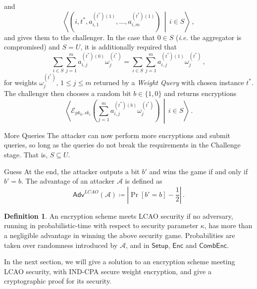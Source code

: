 \documentclass[10pt,letterpaper,oneside,twocolumn,journal]{IEEEtran}
\theoremstyle{definition}
\newtheorem{definition}{Definition}[section]
\theoremstyle{definition}
\theoremstyle{remark}
\begin{document}
\begin{LaTeXdescription}
\begin{equation*}
    \end{equation*}
    and
    \begin{equation*}
        \left\langle\left(i,t^*,a^{(t^*)(1)}_{i,1},\dots,a^{(t^*)(1)}_{i,m}\right)\,\middle|\, i \in S\right\rangle\,,
    \end{equation*}
    and gives them to the challenger. In the case that $0 \in S$ (\textit{i.e.} the aggregator is compromised) and $S = U$, it is additionally required that
    \begin{equation*}
        \sum_{i\in S}\sum^{m}_{j=1} a^{(t^*)(0)}_{i,j}\omega^{(t^*)}_j = \sum_{i \in S}\sum^{m}_{j=1} a^{(t^*)(1)}_{i,j}\omega^{(t^*)}_j\,,
    \end{equation*}
    for weights $\omega^{(t^*)}_j,\,1\leq j \leq m$ returned by a \textit{Weight Query} with chosen instance $t^*$. The challenger then chooses a random bit $b \in \{1,0\}$ and returns encryptions 
    \begin{equation*}
        \left\langle\mathcal{E}_{pk_0,sk_i}\left(\sum^m_{j=1}a^{(t^*)(b)}_{i,j}\omega^{(t^*)}_j\right)\,\middle|\,i\in S\right\rangle\,.
    \end{equation*}
    \item[More Queries] The attacker can now perform more encryptions and submit queries, so long as the queries do not break the requirements in the Challenge stage. That is, $S \subseteq U$.
    \item[Guess] At the end, the attacker outputs a bit $b'$ and wins the game if and only if $b' = b$. The advantage of an attacker $\mathcal{A}$ is defined as
    \begin{equation*}
        \mathsf{Adv}^{LCAO}(\mathcal{A}) \coloneqq \left\lvert \Pr [b'=b] - \frac{1}{2}\right\rvert\,.
    \end{equation*} 
\end{LaTeXdescription}

\begin{definition}
    An encryption scheme meets LCAO security if no adversary, running in probabilistic-time with respect to security parameter $\kappa$, has more than a negligible advantage in winning the above security game. Probabilities are taken over randomness introduced by $\mathcal{A}$, and in $\mathsf{Setup}$, $\mathsf{Enc}$ and $\mathsf{CombEnc}$.
\end{definition}

In the next section, we will give a solution to an encryption scheme meeting LCAO security, with IND-CPA secure weight encryption, and give a cryptographic proof for its security.
\end{document}
